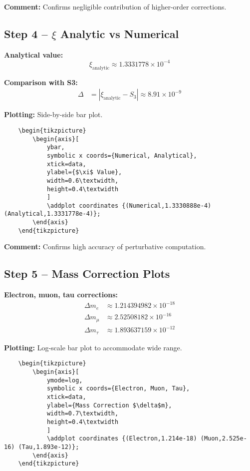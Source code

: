 \documentclass[12pt,a4paper]{article}
\begin{document}
\textbf{Comment:} Confirms negligible contribution of higher-order corrections.

\subsection{Step 4 – $\xi$ Analytic vs Numerical}

\textbf{Analytical value:}
\begin{equation}
	\xi_\text{analytic} \approx 1.3331778 \times 10^{-4}
\end{equation}

\textbf{Comparison with S3:}
\begin{align}
	\Delta &= |\xi_\text{analytic} - S_3| \approx 8.91 \times 10^{-9}
\end{align}

\textbf{Plotting:} Side-by-side bar plot.
\begin{verbatim}
	\begin{tikzpicture}
		\begin{axis}[
			ybar,
			symbolic x coords={Numerical, Analytical},
			xtick=data,
			ylabel={$\xi$ Value},
			width=0.6\textwidth,
			height=0.4\textwidth
			]
			\addplot coordinates {(Numerical,1.3330888e-4) (Analytical,1.3331778e-4)};
		\end{axis}
	\end{tikzpicture}
\end{verbatim}

\textbf{Comment:} Confirms high accuracy of perturbative computation.

\subsection{Step 5 – Mass Correction Plots}

\textbf{Electron, muon, tau corrections:}
\begin{align}
	\Delta m_e &\approx 1.214394982 \times 10^{-18} \\
	\Delta m_\mu &\approx 2.52508182 \times 10^{-16} \\
	\Delta m_\tau &\approx 1.893637159 \times 10^{-12}
\end{align}

\textbf{Plotting:} Log-scale bar plot to accommodate wide range.
\begin{verbatim}
	\begin{tikzpicture}
		\begin{axis}[
			ymode=log,
			symbolic x coords={Electron, Muon, Tau},
			xtick=data,
			ylabel={Mass Correction $\delta$m},
			width=0.7\textwidth,
			height=0.4\textwidth
			]
			\addplot coordinates {(Electron,1.214e-18) (Muon,2.525e-16) (Tau,1.893e-12)};
		\end{axis}
	\end{tikzpicture}
\end{verbatim}
\end{document}
